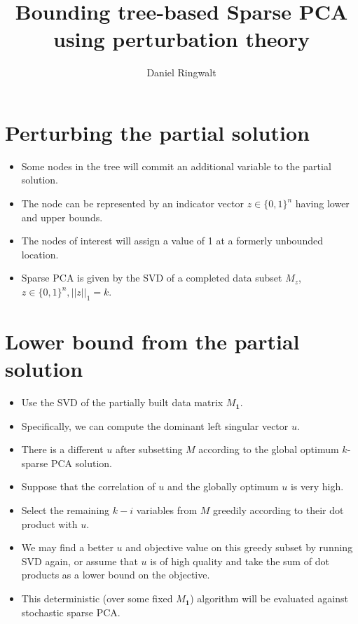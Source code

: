 \documentclass{article}
\title{Bounding tree-based Sparse PCA using perturbation theory}
\author{Daniel Ringwalt}
\begin{document}
	
\maketitle

\section{Perturbing the partial solution}

\begin{itemize}
    \item Some nodes in the tree will commit an additional variable to the partial solution.
    \item The node can be represented by an indicator vector $z \in \{0,1\}^n$ having lower and upper bounds.
    \item The nodes of interest will assign a value of 1 at a formerly unbounded location.
    \item Sparse PCA is given by the SVD of a completed data subset $M_z$, \\ $z \in \{0,1\}^n, ||z||_1 = k$.
\end{itemize}

\section{Lower bound from the partial solution}

\begin{itemize}
    \item Use the SVD of the partially built data matrix $M_\mathbf{1}$.
    \item Specifically, we can compute the dominant left singular vector $u$.
    \item There is a different $u$ after subsetting $M$ according to the global optimum $k$-sparse PCA solution.
    \item Suppose that the correlation of $u$ and the globally optimum $u$ is very high.
    \item Select the remaining $k-i$ variables from $M$ greedily according to their dot product with $u$.
    \item We may find a better $u$ and objective value on this greedy subset by running SVD again, or assume that $u$ is of high quality and take the sum of dot products as a lower bound on the objective.
    \item This deterministic (over some fixed $M_\mathbf{1}$) algorithm will be evaluated against stochastic sparse PCA.
\end{itemize}
\end{document}
